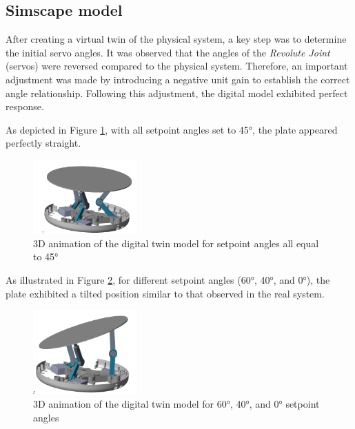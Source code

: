\subsection{Simscape model}\label{Simscape model}
After creating a virtual twin of the physical system, a key step was to determine the initial servo angles. It was observed that the angles of the \textit{Revolute Joint} \cite{noauthor_joint_nodate} (servos) were reversed compared to the physical system. Therefore, an important adjustment was made by introducing a negative unit gain to establish the correct angle relationship. Following this adjustment, the digital model exhibited perfect response.

As depicted in Figure \ref{fig:45degreeanimation}, with all setpoint angles set to 45°, the plate appeared perfectly straight.

\begin{center}
    \begin{figure}[ht!]
        \centering
        \includegraphics[width=4cm, keepaspectratio]{imports/all_45png.png}
        \caption{3D animation of the digital twin model for setpoint angles all equal to 45°}
        \label{fig:45degreeanimation}
    \end{figure}
\end{center}

As illustrated in Figure \ref{fig:60400angleanimation}, for different setpoint angles (60°, 40°, and 0°), the plate exhibited a tilted position similar to that observed in the real system.

\begin{center}
    \begin{figure}[ht!]
        \centering
        \includegraphics[width=4cm, keepaspectratio]{imports/60_40_0_plate.png}
        \caption{3D animation of the digital twin model for 60°, 40°, and 0° setpoint angles}
        \label{fig:60400angleanimation}
    \end{figure}
\end{center}


